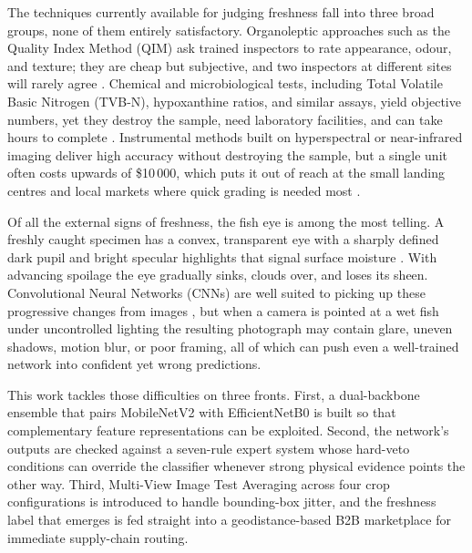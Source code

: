 \documentclass[conference]{IEEEtran}
\begin{document}
The techniques currently available for judging freshness fall into three broad groups, none of them entirely satisfactory. Organoleptic approaches such as the Quality Index Method (QIM) ask trained inspectors to rate appearance, odour, and texture; they are cheap but subjective, and two inspectors at different sites will rarely agree \cite{ref1}. Chemical and microbiological tests, including Total Volatile Basic Nitrogen (TVB-N), hypoxanthine ratios, and similar assays, yield objective numbers, yet they destroy the sample, need laboratory facilities, and can take hours to complete \cite{ref18}. Instrumental methods built on hyperspectral or near-infrared imaging deliver high accuracy without destroying the sample, but a single unit often costs upwards of \$10\,000, which puts it out of reach at the small landing centres and local markets where quick grading is needed most \cite{ref3, ref13}.

Of all the external signs of freshness, the fish eye is among the most telling. A freshly caught specimen has a convex, transparent eye with a sharply defined dark pupil and bright specular highlights that signal surface moisture \cite{ref19}. With advancing spoilage the eye gradually sinks, clouds over, and loses its sheen. Convolutional Neural Networks (CNNs) are well suited to picking up these progressive changes from images \cite{ref19}, but when a camera is pointed at a wet fish under uncontrolled lighting the resulting photograph may contain glare, uneven shadows, motion blur, or poor framing, all of which can push even a well-trained network into confident yet wrong predictions.

This work tackles those difficulties on three fronts. First, a dual-backbone ensemble that pairs MobileNetV2 \cite{ref21} with EfficientNetB0 \cite{ref22} is built so that complementary feature representations can be exploited. Second, the network's outputs are checked against a seven-rule expert system whose hard-veto conditions can override the classifier whenever strong physical evidence points the other way. Third, Multi-View Image Test Averaging across four crop configurations is introduced to handle bounding-box jitter, and the freshness label that emerges is fed straight into a geodistance-based B2B marketplace for immediate supply-chain routing.

\end{document}
